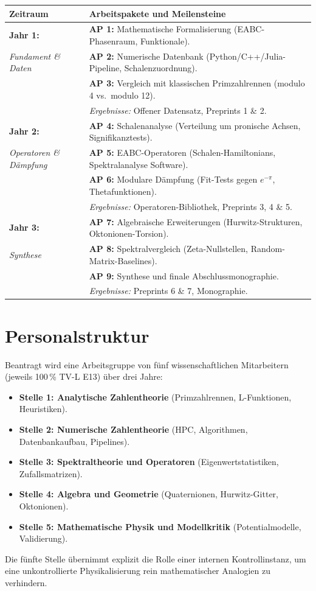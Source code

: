 \documentclass[11pt,a4paper,bibliography=totoc]{scrartcl}
\begin{document}
\noindent\begin{tabular}{p{} p{}}
\toprule
\textbf{Zeitraum} & \textbf{Arbeitspakete und Meilensteine} \\
\midrule
\textbf{Jahr 1:} & \textbf{AP 1:} Mathematische Formalisierung (EABC-Phasenraum, Funktionale). \\
\emph{Fundament \& Daten} & \textbf{AP 2:} Numerische Datenbank (Python/C++/Julia-Pipeline, Schalenzuordnung). \\
                 & \textbf{AP 3:} Vergleich mit klassischen Primzahlrennen (modulo 4 vs.\ modulo 12). \\
                 & \emph{Ergebnisse:} Offener Datensatz, Preprints 1 \& 2. \\
\midrule
\textbf{Jahr 2:} & \textbf{AP 4:} Schalenanalyse (Verteilung um pronische Achsen, Signifikanztests). \\
\emph{Operatoren \& Dämpfung} & \textbf{AP 5:} EABC-Operatoren (Schalen-Hamiltonians, Spektralanalyse Software). \\
                 & \textbf{AP 6:} Modulare Dämpfung (Fit-Tests gegen $e^{-\pi}$, Thetafunktionen). \\
                 & \emph{Ergebnisse:} Operatoren-Bibliothek, Preprints 3, 4 \& 5. \\
\midrule
\textbf{Jahr 3:} & \textbf{AP 7:} Algebraische Erweiterungen (Hurwitz-Strukturen, Oktonionen-Torsion). \\
\emph{Synthese}  & \textbf{AP 8:} Spektralvergleich (Zeta-Nullstellen, Random-Matrix-Baselines). \\
                 & \textbf{AP 9:} Synthese und finale Abschlussmonographie. \\
                 & \emph{Ergebnisse:} Preprints 6 \& 7, Monographie. \\
\bottomrule
\end{tabular}

\section{Personalstruktur}
Beantragt wird eine Arbeitsgruppe von fünf wissenschaftlichen Mitarbeitern (jeweils 100\,\% TV-L E13) über drei Jahre:
\begin{itemize}
    \item \textbf{Stelle 1: Analytische Zahlentheorie} (Primzahlrennen, L-Funktionen, Heuristiken).
    \item \textbf{Stelle 2: Numerische Zahlentheorie} (HPC, Algorithmen, Datenbankaufbau, Pipelines).
    \item \textbf{Stelle 3: Spektraltheorie und Operatoren} (Eigenwertstatistiken, Zufallsmatrizen).
    \item \textbf{Stelle 4: Algebra und Geometrie} (Quaternionen, Hurwitz-Gitter, Oktonionen).
    \item \textbf{Stelle 5: Mathematische Physik und Modellkritik} (Potentialmodelle, Validierung).
\end{itemize}
Die fünfte Stelle übernimmt explizit die Rolle einer internen Kontrollinstanz, um eine unkontrollierte Physikalisierung rein mathematischer Analogien zu verhindern.
\end{document}
